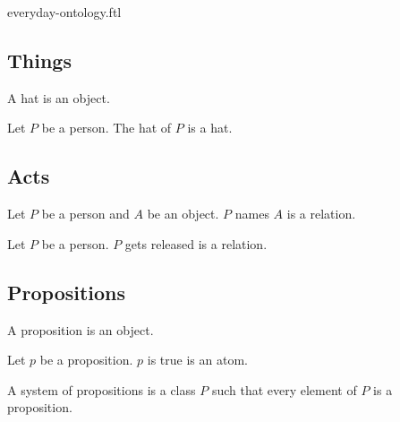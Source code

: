 \documentclass{naproche-library}
\begin{document}
\begin{smodule}{everyday-ontology.ftl}
\subsection{Things}

\begin{signature*}[forthel]
  A hat is an object.
\end{signature*}

\begin{signature*}[forthel]
  Let $P$ be a person.
  The hat of $P$ is a hat.
\end{signature*}


\subsection{Acts}

\begin{signature*}[forthel]
  Let $P$ be a person and $A$ be an object.
  $P$ names $A$ is a relation.
\end{signature*}

\begin{signature*}[forthel]
  Let $P$ be a person.
  $P$ gets released is a relation.
  \end{signature*}


\subsection{Propositions}

\begin{signature*}[forthel]
  A proposition is an object.
\end{signature*}

\begin{signature*}[forthel]
  Let $p$ be a proposition.
  $p$ is true is an atom.
\end{signature*}

\begin{definition*}[forthel]
  A system of propositions is a class $P$ such that every element of $P$ is a proposition.
\end{definition*}
\end{smodule}
\end{document}
